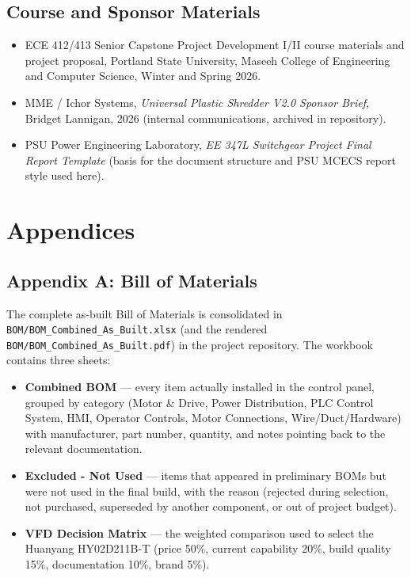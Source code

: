 \documentclass[hidelinks,12pt]{article}
\begin{document}
\subsection*{Course and Sponsor Materials}
\begin{itemize}\setlength{\itemsep}{2pt}
    \item ECE 412/413 Senior Capstone Project Development I/II course materials and project proposal, Portland State University, Maseeh College of Engineering and Computer Science, Winter and Spring 2026.
    \item MME / Ichor Systems, \emph{Universal Plastic Shredder V2.0 Sponsor Brief}, Bridget Lannigan, 2026 (internal communications, archived in repository).
    \item PSU Power Engineering Laboratory, \emph{EE 347L Switchgear Project Final Report Template} (basis for the document structure and PSU MCECS report style used here).
\end{itemize}

\section{Appendices}

\subsection{Appendix A: Bill of Materials}

The complete as-built Bill of Materials is consolidated in \texttt{BOM/BOM\_Combined\_As\_Built.xlsx}
(and the rendered \texttt{BOM/BOM\_Combined\_As\_Built.pdf}) in the project repository. The
workbook contains three sheets:

\begin{itemize}
    \item \textbf{Combined BOM} --- every item actually installed in the control panel,
      grouped by category (Motor \& Drive, Power Distribution, PLC Control System, HMI,
      Operator Controls, Motor Connections, Wire/Duct/Hardware) with manufacturer, part
      number, quantity, and notes pointing back to the relevant documentation.
    \item \textbf{Excluded - Not Used} --- items that appeared in preliminary BOMs but
      were not used in the final build, with the reason (rejected during selection,
      not purchased, superseded by another component, or out of project budget).
    \item \textbf{VFD Decision Matrix} --- the weighted comparison used to select the
      Huanyang HY02D211B-T (price 50\%, current capability 20\%, build quality 15\%,
      documentation 10\%, brand 5\%).
\end{itemize}
\end{document}
